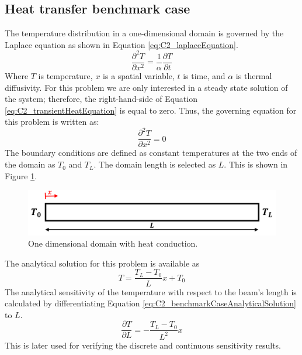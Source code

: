 \subsection{Heat transfer benchmark case}
The temperature distribution in a one-dimensional domain is governed by the Laplace equation as shown in Equation \eqref{eq:C2_laplaceEquation}.
%
\begin{equation}\label{eq:C2_transientHeatEquation}
    \frac{\partial^2 T}{\partial x^2} = \frac{1}{\alpha} \frac{\partial T}{\partial t}
\end{equation}
%
Where $T$ is temperature, $x$ is a spatial variable, $t$ is time, and $\alpha$ is thermal diffusivity. For this problem we are only interested in a steady state solution of the system; therefore, the right-hand-side of Equation \eqref{eq:C2_transientHeatEquation} is equal to zero. Thus, the governing equation for this problem is written as:
%
\begin{equation}\label{eq:C2_laplaceEquation}
    \frac{\partial^2 T}{\partial x^2} = 0
\end{equation}
%
The boundary conditions are defined as constant temperatures at the two ends of the domain as $T_0$ and $T_L$. The domain length is selected as $L$. This is shown in Figure \ref{fig:C2_benchmarkCase}.
%
\begin{figure}[h]
    \centering
    \includegraphics[width=14.00cm]{Chapter_2/figure/benchmark_case.png}
    \caption{One dimensional domain with heat conduction.}
    \label{fig:C2_benchmarkCase}
\end{figure}
%
The analytical solution for this problem is available as
%
\begin{equation}\label{eq:C2_benchmarkCaseAnalyticalSolution}
    T = \frac{T_L - T_0}{L} x + T_0
\end{equation}
%
The analytical sensitivity of the temperature with respect to the beam's length is calculated by differentiating Equation \eqref{eq:C2_benchmarkCaseAnalyticalSolution} to $L$.
%
\begin{equation}
    \frac{\partial T}{\partial L} = -\frac{T_L - T_0}{L^2} x
\end{equation}
%
This is later used for verifying the discrete and continuous sensitivity results.
